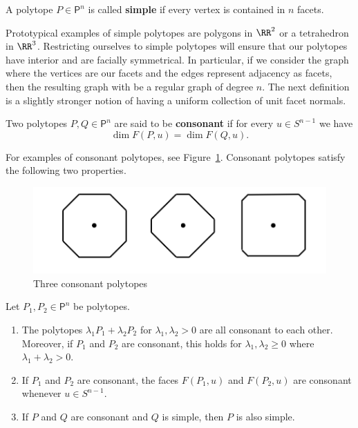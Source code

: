 \documentclass[11pt]{article}
\begin{document}
\begin{defn}
    A polytope $P \in \mathsf{P}^n$ is called \textbf{simple} if every vertex is contained in $n$ facets. 
\end{defn}

Prototypical examples of simple polytopes are polygons in $\RR^2$ or a tetrahedron in $\RR^3$. Restricting ourselves to simple polytopes will ensure that our polytopes have interior and are facially symmetrical. In particular, if we consider the graph where the vertices are our facets and the edges represent adjacency as facets, then the resulting graph with be a regular graph of degree $n$. The next definition is a slightly stronger notion of having a uniform collection of unit facet normals. 

\begin{defn}
    Two polytopes $P, Q \in \mathsf{P}^n$ are said to be \textbf{consonant} if for every $u \in S^{n-1}$ we have 
    \[
        \dim F(P, u) = \dim F(Q, u).     
    \]
\end{defn}

For examples of consonant polytopes, see Figure~\ref{consonance}. Consonant polytopes satisfy the following two properties. 

\begin{figure}[h]
\begin{center}
    \includegraphics[scale = 0.6]{../images/image8.png}
    \caption{Three consonant polytopes}
    \label{consonance}
\end{center}
\end{figure}
\begin{prop}
    Let $P_1, P_2 \in \mathsf{P}^n$ be polytopes. 
    \begin{enumerate}[label = (\alph*)]
        \item The polytopes $\lambda_1 P_1 + \lambda_2 P_2$ for $\lambda_1, \lambda_2 > 0$ are all consonant to each other. Moreover, if $P_1$ and $P_2$ are consonant, this holds for $\lambda_1, \lambda_2 \geq 0$ where $\lambda_1 + \lambda_2 > 0$. 
        \item If $P_1$ and $P_2$ are consonant, the faces $F(P_1, u)$ and $F(P_2, u)$ are consonant whenever $u \in S^{n-1}$.
        \item If $P$ and $Q$ are consonant and $Q$ is simple, then $P$ is also simple.  
    \end{enumerate}
\end{prop}
\end{document}

